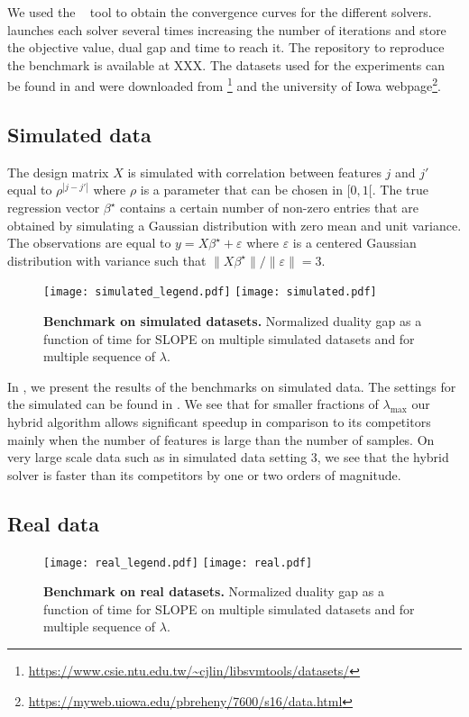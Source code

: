 We used the ~\parencite{moreau2022benchopt} tool to obtain the convergence curves for the different solvers.
 launches each solver several times increasing the number of iterations and store the objective value, dual gap and time to reach it.
The repository to reproduce the benchmark is available at XXX.
The datasets used for the experiments can be found in  and were downloaded from \footnote{\url{https://www.csie.ntu.edu.tw/~cjlin/libsvmtools/datasets/}} and the university of Iowa webpage\footnote{\url{https://myweb.uiowa.edu/pbreheny/7600/s16/data.html}}.


\subsection{Simulated data}

The design matrix $X$ is simulated with correlation between features $j$ and $j'$ equal to $\rho^{|j-j'|}$ where $\rho$ is a parameter that can be chosen in $[0, 1[$.
The true regression vector $\beta^\star$ contains a certain number of non-zero entries that are obtained by simulating a Gaussian distribution with zero mean and unit variance.
The observations are equal to $y=X\beta^\star + \varepsilon$ where $\varepsilon$ is a centered Gaussian distribution with variance such that $\lVert X\beta^\star\rVert / \lVert \varepsilon \rVert = 3$.
\begin{figure*}[htb]
  \centering
  \texttt{[image: simulated\_legend.pdf]}
  \texttt{[image: simulated.pdf]}
  \caption{\textbf{Benchmark on simulated datasets.} Normalized duality gap as a function of time for SLOPE on multiple simulated datasets and for multiple sequence of $\lambda$.}
  \label{fig:simulated}
\end{figure*}

In , we present the results of the benchmarks on simulated data.
The settings for the simulated can be found in .
We see that for smaller fractions of $\lambda_{\text{max}}$ our hybrid algorithm allows significant speedup in comparison to its competitors mainly when the number of features is large than the number of samples.
On very large scale data such as in simulated data setting $3$, we see that the hybrid solver is faster than its competitors by one or two orders of magnitude.


\subsection{Real data}
\begin{figure*}[htb]
  \centering
  \texttt{[image: real\_legend.pdf]}
  \texttt{[image: real.pdf]}
  \caption{\textbf{Benchmark on real datasets.} Normalized duality gap as a function of time for SLOPE on multiple simulated datasets and for multiple sequence of $\lambda$.}
  \label{fig:real}
\end{figure*}
